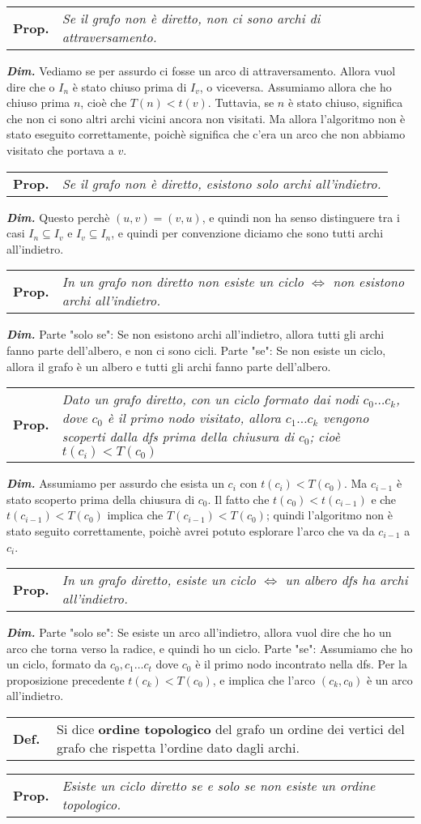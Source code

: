 \documentclass[a4paper,10pt]{article} %
\newcommand{\dimo}[1]{%
    \smallbreak \par \hfill\begin{minipage}{0.92\linewidth}{ \scriptsize {\textbf{\em{Dim.}}} {#1} }\end{minipage} \smallskip \par}
\renewcommand{\b}[1]{%
    {\textbf{#1}}}
\newcommand{\mdef}[1]{%
    {\smallbreak\par\begin{tabular}{ll} \textbf{Def.$\;\;$} & \begin{minipage}[t]{0.80\columnwidth}\normalsize  {#1}\end{minipage}\tabularnewline \end{tabular}}\smallskip\par}
\newcommand{\mprop}[1]{%
    {\smallbreak\par\begin{tabular}{ll} \textbf{Prop.} & \begin{minipage}[t]{0.8\columnwidth}\emph  {#1}\end{minipage}\tabularnewline \end{tabular}}\smallskip\par}
\begin{document}
\mprop{Se il grafo non è diretto, non ci sono archi di attraversamento.}
\dimo{Vediamo se per assurdo ci fosse un arco di attraversamento. Allora vuol dire che o $I_n$ è stato chiuso prima di $I_v$, o viceversa. Assumiamo allora che ho chiuso prima $n$, cioè che $T(n) < t(v)$. Tuttavia, se $n$ è stato chiuso, significa che non ci sono altri archi vicini ancora non visitati. Ma allora l'algoritmo non è stato eseguito correttamente, poichè significa che c'era un arco che non abbiamo visitato che portava a $v$.}

\mprop{Se il grafo non è diretto, esistono solo archi all'indietro.}
\dimo{Questo perchè $(u, v) = (v, u)$, e quindi non ha senso distinguere tra i casi $I_n \subseteq I_v$ e $I_v \subseteq I_n$, e quindi per convenzione diciamo che sono tutti archi all'indietro.}

\mprop{In un grafo non diretto non esiste un ciclo $\Leftrightarrow$ non esistono archi all'indietro.}
\dimo{Parte "solo se": Se non esistono archi all'indietro, allora tutti gli archi fanno parte dell'albero, e non ci sono cicli. Parte "se": Se non esiste un ciclo, allora il grafo è un albero e tutti gli archi fanno parte dell'albero.}

\mprop{Dato un grafo diretto, con un ciclo formato dai nodi $c_0 \ldots c_k$, dove $c_0$ è il primo nodo visitato, allora  $c_1 \ldots c_k$ vengono scoperti dalla dfs prima della chiusura di $c_0$; cioè $t(c_i) < T(c_0)$}
\dimo{Assumiamo per assurdo che esista un $c_i$ con $t(c_i) < T(c_0)$. Ma $c_{i-1}$ è stato scoperto prima della chiusura di $c_0$. Il fatto che $t(c_0) < t(c_{i-1})$ e che $t(c_{i-1}) < T(c_0)$ implica che $T(c_{i-1}) < T(c_0)$; quindi l'algoritmo non è stato seguito correttamente, poichè avrei potuto esplorare l'arco che va da $c_{i-1}$ a $c_i$. }

\mprop{In un grafo diretto, esiste un ciclo $\Leftrightarrow$ un albero dfs ha archi all'indietro.}
\dimo{Parte "solo se": Se esiste un arco all'indietro, allora vuol dire che ho un arco che torna verso la radice, e quindi ho un ciclo. Parte "se": Assumiamo che ho un ciclo, formato da $c_0, c_1 \ldots c_t$ dove $c_0$ è il primo nodo incontrato nella dfs. Per la proposizione precedente $t(c_k) < T(c_0)$, e implica che l'arco $(c_k, c_0)$ è un arco all'indietro.}

\mdef{Si dice \b{ordine topologico} del grafo un ordine dei vertici del grafo che rispetta l'ordine dato dagli archi.}

\mprop{Esiste un ciclo diretto se e solo se non esiste un ordine topologico.}
\end{document}
